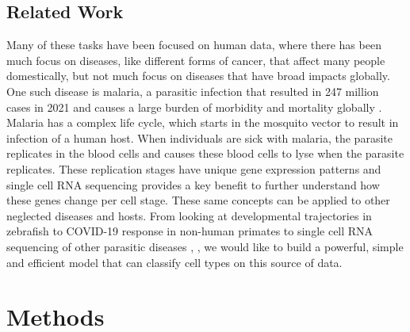 \documentclass{article}
\begin{document}
\subsection{Related Work}
Many of these tasks have been focused on human data, where there has been much focus on diseases, like different forms of cancer, that affect many people domestically, but not much focus on diseases that have broad impacts globally. One such disease is malaria, a parasitic infection that resulted in 247 million cases in 2021 and causes a large burden of morbidity and mortality globally \cite{monroeReflections2021World2022}. Malaria has a complex life cycle, which starts in the mosquito vector to result in infection of a human host. When individuals are sick with malaria, the parasite replicates in the blood cells and causes these blood cells to lyse when the parasite replicates. These replication stages have unique gene expression patterns and single cell RNA sequencing provides a key benefit to further understand how these genes change per cell stage. These same concepts can be applied to other neglected diseases and hosts. From looking at developmental trajectories in zebrafish \cite{farrellSinglecellReconstructionDevelopmental2018} to COVID-19 response in non-human primates \cite{speranzaSinglecellRNASequencing2021} to single cell RNA sequencing of other parasitic diseases \cite{briggsSinglecellTranscriptomicAnalysis2021, howickMalariaCellAtlas2019, rezvaniComparativeSinglecellTranscriptional2022}, \cite{wendtSinglecellRNAseqAtlas2020}, we would like to build a powerful, simple and efficient model that can classify cell types on this source of data.


\section{Methods}
\end{document}
